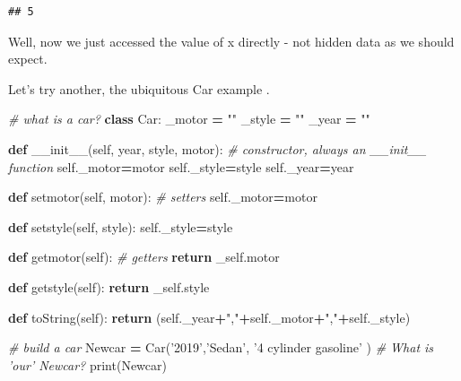 \documentclass[]{book}
\newenvironment{Shaded}{\begin{snugshade}}{\end{snugshade}}
\newcommand{\KeywordTok}[1]{\textcolor[rgb]{0.13,0.29,0.53}{\textbf{#1}}}
\newcommand{\StringTok}[1]{\textcolor[rgb]{0.31,0.60,0.02}{#1}}
\newcommand{\CommentTok}[1]{\textcolor[rgb]{0.56,0.35,0.01}{\textit{#1}}}
\newcommand{\FunctionTok}[1]{\textcolor[rgb]{0.00,0.00,0.00}{#1}}
\newcommand{\VariableTok}[1]{\textcolor[rgb]{0.00,0.00,0.00}{#1}}
\newcommand{\ControlFlowTok}[1]{\textcolor[rgb]{0.13,0.29,0.53}{\textbf{#1}}}
\newcommand{\OperatorTok}[1]{\textcolor[rgb]{0.81,0.36,0.00}{\textbf{#1}}}
\newcommand{\BuiltInTok}[1]{#1}
\newcommand{\NormalTok}[1]{#1}
\theoremstyle{definition}
\theoremstyle{definition}
\theoremstyle{definition}
\theoremstyle{remark}
\begin{document}
\begin{verbatim}
## 5
\end{verbatim}

Well, now we just accessed the value of x directly - not hidden data as
we should expect.

Let's try another, the ubiquitous Car example .

\begin{Shaded}
\begin{Highlighting}[]
\CommentTok{# what is a car?}
\KeywordTok{class}\NormalTok{ Car:}
\NormalTok{  _motor }\OperatorTok{=} \StringTok{""}
\NormalTok{  _style }\OperatorTok{=} \StringTok{""}
\NormalTok{  _year }\OperatorTok{=} \StringTok{""}
  
  \KeywordTok{def} \FunctionTok{__init__}\NormalTok{(}\VariableTok{self}\NormalTok{, year, style, motor):      }\CommentTok{# constructor, always an __init__ function}
    \VariableTok{self}\NormalTok{._motor}\OperatorTok{=}\NormalTok{motor}
    \VariableTok{self}\NormalTok{._style}\OperatorTok{=}\NormalTok{style}
    \VariableTok{self}\NormalTok{._year}\OperatorTok{=}\NormalTok{year}
    
  \KeywordTok{def}\NormalTok{ setmotor(}\VariableTok{self}\NormalTok{, motor):       }\CommentTok{# setters}
    \VariableTok{self}\NormalTok{._motor}\OperatorTok{=}\NormalTok{motor}
    
  \KeywordTok{def}\NormalTok{ setstyle(}\VariableTok{self}\NormalTok{, style):}
    \VariableTok{self}\NormalTok{._style}\OperatorTok{=}\NormalTok{style}
    
  \KeywordTok{def}\NormalTok{ getmotor(}\VariableTok{self}\NormalTok{):              }\CommentTok{# getters}
    \ControlFlowTok{return}\NormalTok{ _self.motor}
    
  \KeywordTok{def}\NormalTok{ getstyle(}\VariableTok{self}\NormalTok{): }
    \ControlFlowTok{return}\NormalTok{ _self.style}
    
  \KeywordTok{def}\NormalTok{ toString(}\VariableTok{self}\NormalTok{):}
    \ControlFlowTok{return}\NormalTok{ (}\VariableTok{self}\NormalTok{._year}\OperatorTok{+}\StringTok{","}\OperatorTok{+}\VariableTok{self}\NormalTok{._motor}\OperatorTok{+}\StringTok{","}\OperatorTok{+}\VariableTok{self}\NormalTok{._style)}
    
    
\CommentTok{# build a car}
\NormalTok{Newcar }\OperatorTok{=}\NormalTok{ Car(}\StringTok{'2019'}\NormalTok{,}\StringTok{'Sedan'}\NormalTok{, }\StringTok{'4 cylinder gasoline'}\NormalTok{ )}
\CommentTok{# What is 'our' Newcar?}
\BuiltInTok{print}\NormalTok{(Newcar)}
\end{Highlighting}
\end{Shaded}
\end{document}

